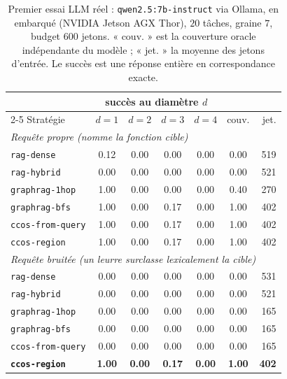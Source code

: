 \documentclass[11pt]{article}
\newcommand{\code}[1]{\texttt{#1}}
\begin{document}
\begin{table}[h]
\centering
\begin{tabular}{lcccccr}
\toprule
& \multicolumn{4}{c}{succès au diamètre $d$} & & \\
\cmidrule(lr){2-5}
Stratégie & $d{=}1$ & $d{=}2$ & $d{=}3$ & $d{=}4$ & couv. & jet. \\
\midrule
\multicolumn{7}{l}{\emph{Requête propre (nomme la fonction cible)}}\\
\code{rag-dense}      & 0.12 & 0.00 & 0.00 & 0.00 & 0.00 & 519 \\
\code{rag-hybrid}     & 0.00 & 0.00 & 0.00 & 0.00 & 0.00 & 521 \\
\code{graphrag-1hop}  & 1.00 & 0.00 & 0.00 & 0.00 & 0.40 & 270 \\
\code{graphrag-bfs}   & 1.00 & 0.00 & 0.17 & 0.00 & 1.00 & 402 \\
\code{ccos-from-query}& 1.00 & 0.00 & 0.17 & 0.00 & 1.00 & 402 \\
\code{ccos-region}    & 1.00 & 0.00 & 0.17 & 0.00 & 1.00 & 402 \\
\midrule
\multicolumn{7}{l}{\emph{Requête bruitée (un leurre surclasse lexicalement la cible)}}\\
\code{rag-dense}      & 0.00 & 0.00 & 0.00 & 0.00 & 0.00 & 531 \\
\code{rag-hybrid}     & 0.00 & 0.00 & 0.00 & 0.00 & 0.00 & 521 \\
\code{graphrag-1hop}  & 0.00 & 0.00 & 0.00 & 0.00 & 0.00 & 165 \\
\code{graphrag-bfs}   & 0.00 & 0.00 & 0.00 & 0.00 & 0.00 & 165 \\
\code{ccos-from-query}& 0.00 & 0.00 & 0.00 & 0.00 & 0.00 & 165 \\
\textbf{\code{ccos-region}} & \textbf{1.00} & \textbf{0.00} & \textbf{0.17} & \textbf{0.00} & \textbf{1.00} & \textbf{402} \\
\bottomrule
\end{tabular}
\caption{Premier essai LLM réel : \code{qwen2.5:7b-instruct} via Ollama, en embarqué
(NVIDIA Jetson AGX Thor), $20$ tâches, graine $7$, budget $600$ jetons. « couv. » est
la couverture oracle indépendante du modèle ; « jet. » la moyenne des jetons d'entrée.
Le succès est une réponse entière en correspondance exacte.}
\label{tab:real}
\end{table}
\end{document}
